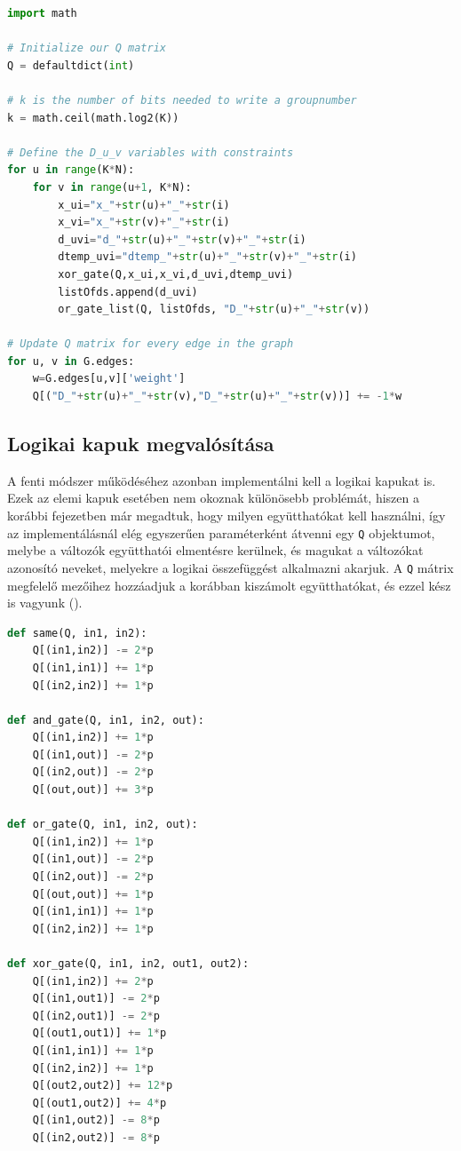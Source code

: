 \vspace{5pt}
\begin{lstlisting}[language=python,caption=Maximális K-vágás QUBO (bináris kódolás),label=code:maxKCutQUBOBinary]
import math

# Initialize our Q matrix
Q = defaultdict(int)

# k is the number of bits needed to write a groupnumber
k = math.ceil(math.log2(K))

# Define the D_u_v variables with constraints
for u in range(K*N):
	for v in range(u+1, K*N):
		x_ui="x_"+str(u)+"_"+str(i)
		x_vi="x_"+str(v)+"_"+str(i)
		d_uvi="d_"+str(u)+"_"+str(v)+"_"+str(i)
		dtemp_uvi="dtemp_"+str(u)+"_"+str(v)+"_"+str(i)
		xor_gate(Q,x_ui,x_vi,d_uvi,dtemp_uvi)
		listOfds.append(d_uvi)
		or_gate_list(Q, listOfds, "D_"+str(u)+"_"+str(v))

# Update Q matrix for every edge in the graph
for u, v in G.edges:
	w=G.edges[u,v]['weight']
	Q[("D_"+str(u)+"_"+str(v),"D_"+str(u)+"_"+str(v))] += -1*w
\end{lstlisting}

\subsection{Logikai kapuk megvalósítása}

A fenti módszer működéséhez azonban implementálni kell a logikai kapukat is.
Ezek az elemi kapuk esetében nem okoznak különösebb problémát, hiszen a korábbi fejezetben már megadtuk, hogy milyen együtthatókat kell használni, így az implementálásnál elég egyszerűen paraméterként átvenni egy \verb+Q+ objektumot, melybe a változók együtthatói elmentésre kerülnek, és magukat a változókat azonosító neveket, melyekre a logikai összefüggést alkalmazni akarjuk. A \verb+Q+ mátrix megfelelő mezőihez hozzáadjuk a korábban kiszámolt együtthatókat, és ezzel kész is vagyunk ().

\vspace{5pt}
\begin{lstlisting}[language=python,caption=Elemi kapuk,label=code:ElementaryGates]	
def same(Q, in1, in2):
	Q[(in1,in2)] -= 2*p
	Q[(in1,in1)] += 1*p
	Q[(in2,in2)] += 1*p

def and_gate(Q, in1, in2, out):
	Q[(in1,in2)] += 1*p
	Q[(in1,out)] -= 2*p
	Q[(in2,out)] -= 2*p
	Q[(out,out)] += 3*p

def or_gate(Q, in1, in2, out):
	Q[(in1,in2)] += 1*p
	Q[(in1,out)] -= 2*p
	Q[(in2,out)] -= 2*p
	Q[(out,out)] += 1*p
	Q[(in1,in1)] += 1*p
	Q[(in2,in2)] += 1*p

def xor_gate(Q, in1, in2, out1, out2):
	Q[(in1,in2)] += 2*p
	Q[(in1,out1)] -= 2*p
	Q[(in2,out1)] -= 2*p
	Q[(out1,out1)] += 1*p
	Q[(in1,in1)] += 1*p
	Q[(in2,in2)] += 1*p
	Q[(out2,out2)] += 12*p
	Q[(out1,out2)] += 4*p
	Q[(in1,out2)] -= 8*p
	Q[(in2,out2)] -= 8*p	
\end{lstlisting}

